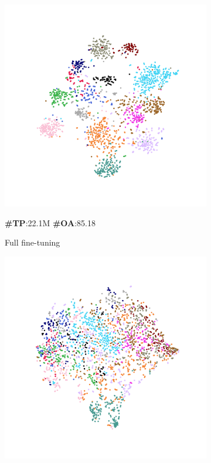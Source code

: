 \begin{figure}
    \centering
    \begin{subfigure}{0.19\textwidth}
        \centering
        \includegraphics[width=\linewidth]{fig/tsne/point_mae.pdf}
        \caption*{\textbf{\#TP}:22.1M \textbf{\#OA}:85.18}
        \caption{Full fine-tuning}
        \label{fig:sub1}
    \end{subfigure}
    \hfill
    \begin{subfigure}{0.19\textwidth}
        \centering
        \includegraphics[width=\linewidth]{fig/tsne/LP.pdf}

\end{subfigure}
\end{figure}
